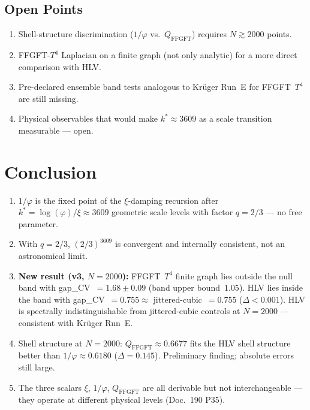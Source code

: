 \subsection{Open Points}

\begin{enumerate}
  \item Shell-structure discrimination ($1/\varphi$ vs.\ $Q_\mathrm{FFGFT}$)
        requires $N \gtrsim 2000$ points.
  \item FFGFT-$T^4$ Laplacian on a finite graph (not only analytic)
        for a more direct comparison with HLV.
  \item Pre-declared ensemble band tests analogous to Krüger Run~E
        for FFGFT~$T^4$ are still missing.
  \item Physical observables that would make $k^* \approx 3609$ as a
        scale transition measurable --- open.
\end{enumerate}

\section{Conclusion}

\begin{enumerate}
  \item $1/\varphi$ is the fixed point of the $\xi$-damping recursion after
        $k^* = \log(\varphi)/\xi \approx 3609$ geometric scale levels
        with factor $q = 2/3$ --- no free parameter.
  \item With $q = 2/3$, $(2/3)^{3609}$ is convergent and internally
        consistent, not an astronomical limit.
  \item \textbf{New result (v3, $N=2000$):} FFGFT~$T^4$ finite graph lies
        outside the null band with gap\_CV~$= 1.68 \pm 0.09$
        (band upper bound~$1.05$). HLV lies inside the band with
        gap\_CV~$= 0.755 \approx$ jittered-cubic~$= 0.755$
        ($\Delta < 0.001$). HLV is spectrally indistinguishable from
        jittered-cubic controls at $N=2000$ --- consistent with Krüger Run~E.
  \item Shell structure at $N=2000$: $Q_\mathrm{FFGFT} \approx 0.6677$
        fits the HLV shell structure better than $1/\varphi \approx 0.6180$
        ($\Delta = 0.145$). Preliminary finding; absolute errors still large.
  \item The three scalars $\xi$, $1/\varphi$, $Q_\mathrm{FFGFT}$ are all
        derivable but not interchangeable --- they operate at different
        physical levels (Doc.~190 P35).
\end{enumerate}

